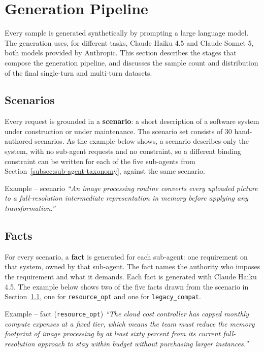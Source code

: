 \section{Generation Pipeline}
\label{sec:generation-pipeline}

Every sample is generated synthetically by prompting a large language model. The generation uses, for different tasks, Claude Haiku 4.5 and Claude Sonnet 5, both models provided by Anthropic. This section describes the stages that compose the generation pipeline, and discusses the sample count and distribution of the final single-turn and multi-turn datasets.

\subsection{Scenarios}
\label{subsec:scenarios}

Every request is grounded in a \textbf{scenario}: a short description of a software system under construction or under maintenance. The scenario set consists of 30 hand-authored scenarios. As the example below shows, a scenario describes only the system, with no sub-agent requests and no constraint, so a different binding constraint can be written for each of the five sub-agents from Section~\ref{subsec:sub-agent-taxonomy}, against the same scenario.

\begin{scenariobox}{Example -- scenario}
\textit{``An image processing routine converts every uploaded picture to a full-resolution intermediate representation in memory before applying any transformation.''}
\end{scenariobox}

\subsection{Facts}
\label{subsec:pipeline-facts}

For every scenario, a \textbf{fact} is generated for each sub-agent: one requirement on that system, owned by that sub-agent. The fact names the authority who imposes the requirement and what it demands. Each fact is generated with Claude Haiku 4.5. The example below shows two of the five facts drawn from the scenario in Section~\ref{subsec:scenarios}, one for \texttt{resource\_opt} and one for \texttt{legacy\_compat}.

\begin{scenariobox}{Example -- fact (\texttt{resource\_opt})}
\textit{``The cloud cost controller has capped monthly compute expenses at a fixed tier, which means the team must reduce the memory footprint of image processing by at least sixty percent from its current full-resolution approach to stay within budget without purchasing larger instances.''}
\end{scenariobox}

